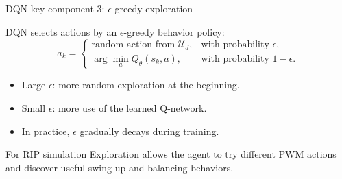 \documentclass[aspectratio=169]{beamer}
\begin{document}
\begin{frame}{DQN key component 3: \(\epsilon\)-greedy exploration}

DQN selects actions by an \(\epsilon\)-greedy behavior policy:
\[
a_k=
\begin{cases}
\text{random action from }\mathcal U_d, & \text{with probability }\epsilon,\\
\arg\min_a Q_\theta(s_k,a), & \text{with probability }1-\epsilon.
\end{cases}
\]

\vspace{0.2cm}

\begin{itemize}
    \item Large \(\epsilon\): more random exploration at the beginning.
    \vspace{0.2cm}

    \item Small \(\epsilon\): more use of the learned Q-network.
    \vspace{0.2cm}

    \item In practice, \(\epsilon\) gradually decays during training.
\end{itemize}

\vspace{0.15cm}

\begin{block}{For RIP simulation}
\small
Exploration allows the agent to try different PWM actions and discover useful swing-up and balancing behaviors.
\end{block}

\end{frame}
\end{document}
